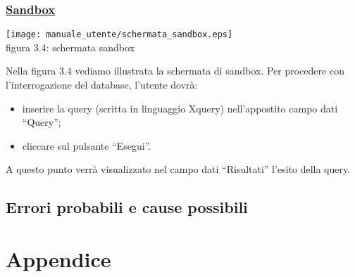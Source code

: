 \subsection{\underline{Sandbox}}
\begin{center}
 \texttt{[image: manuale\_utente/schermata\_sandbox.eps]} \\
 figura 3.4: schermata sandbox
\end{center}
Nella figura 3.4 vediamo illustrata la schermata di sandbox. Per procedere con l'interrogazione del database, l'utente dovr\`a:
\begin{itemize}
\item inserire la query (scritta in linguaggio Xquery) nell'appostito campo dati ``Query'';
\item cliccare sul pulsante ``Esegui''.
\end{itemize}
A questo punto verr\`a visualizzato nel campo dati ``Risultati'' l'esito della query.
\section{Errori probabili e cause possibili}
\chapter{Appendice}
